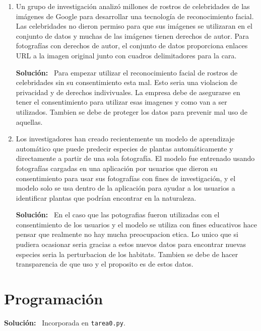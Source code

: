 \documentclass[11pt,letterpaper]{article}
\newenvironment{solution}{%
  \noindent\begin{shaded}
  \textbf{Solución:}\ }{
  \end{shaded}%
}
\begin{document}
\begin{enumerate}
\item%
  Un grupo de investigación analizó millones de rostros de
  celebridades de las imágenes de Google para desarrollar una
  tecnología de reconocimiento facial.  Las celebridades no dieron
  permiso para que sus imágenes se utilizaran en el conjunto de datos
  y muchas de las imágenes tienen derechos de autor.  Para fotografías
  con derechos de autor, el conjunto de datos proporciona enlaces URL
  a la imagen original junto con cuadros delimitadores para la cara.
  \begin{solution}
    Para empezar utilizar el reconocimiento facial de rostros de celebridades sin su consentimiento esta mal. Esto seria una violacion de privacidad y de derechos indivivuales. La empresa debe de asegurarse en tener el consentimiento para utilizar esas imagenes y como van a ser utilizados. Tambien se debe de proteger los datos para prevenir mal uso de aquellas.
  \end{solution}
  
\item%
  Los investigadores han creado recientemente un modelo de aprendizaje
  automático que puede predecir especies de plantas automáticamente y
  directamente a partir de una sola fotografía.  El modelo fue
  entrenado usando fotografías cargadas en una aplicación por usuarios
  que dieron su consentimiento para usar sus fotografías con fines de
  investigación, y el modelo solo se usa dentro de la aplicación para
  ayudar a los usuarios a identificar plantas que podrían encontrar en
  la naturaleza.
  \begin{solution}
    En el caso que las potografias fueron utilizadas con el consentimiento de los usuarios y el modelo se utiliza con fines educativos hace pensar que realmente no hay mucha preocupacion etica. Lo unico que si pudiera ocasionar seria gracias a estos nuevos datos para encontrar nuevas especies seria la perturbacion de los habitats. Tambien se debe de hacer transparencia de que uso y el proposito es de estos datos.
  \end{solution}
\end{enumerate}



\section*{Programación}

\begin{solution}
  Incorporada en \texttt{tarea0.py}.
\end{solution}
\end{document}
